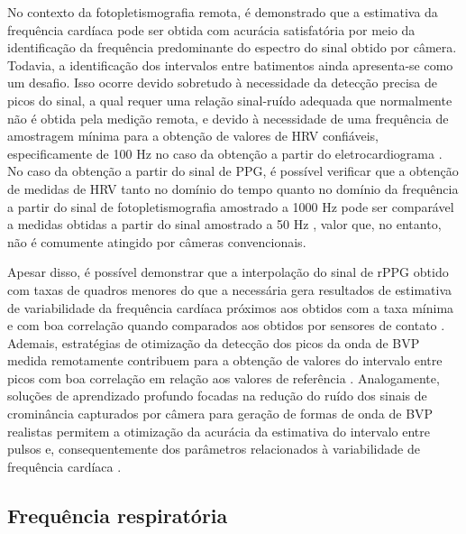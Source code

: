 No contexto da fotopletismografia remota, é demonstrado que a estimativa da frequência cardíaca pode ser obtida com acurácia satisfatória por meio da identificação da frequência predominante do espectro do sinal obtido por câmera. Todavia, a identificação dos intervalos entre batimentos ainda apresenta-se como um desafio. Isso ocorre devido sobretudo à necessidade da detecção precisa de picos do sinal, a qual requer uma relação sinal-ruído adequada que normalmente não é obtida pela medição remota, e devido à necessidade de uma frequência de amostragem mínima para a obtenção de valores de HRV confiáveis, especificamente de 100 Hz no caso da obtenção a partir do eletrocardiograma \cite{malik1996heart}. No caso da obtenção a partir do sinal de PPG, é possível verificar que a obtenção de medidas de HRV tanto no domínio do tempo quanto no domínio da frequência a partir do sinal de fotopletismografia amostrado a 1000 Hz pode ser comparável a medidas obtidas a partir do sinal amostrado a 50 Hz \cite{pelaez2021impact}, valor que, no entanto, não é comumente atingido por câmeras convencionais.

Apesar disso, é possível demonstrar que a interpolação do sinal de rPPG obtido com taxas de quadros menores do que a necessária gera resultados de estimativa de variabilidade da frequência cardíaca próximos aos obtidos com a taxa mínima e com boa correlação quando comparados aos obtidos por sensores de contato \cite{sun2013noncontact}. Ademais, estratégias de otimização da detecção dos picos da onda de BVP medida remotamente contribuem para a obtenção de valores do intervalo entre picos com boa correlação em relação aos valores de referência \cite{maki2019inter, li2020video}. Analogamente, soluções de aprendizado profundo focadas na redução do ruído dos sinais de crominância capturados por câmera para geração de formas de onda de BVP realistas permitem a otimização da acurácia da estimativa do intervalo entre pulsos e, consequentemente dos parâmetros relacionados à variabilidade de frequência cardíaca  \cite{Song2021pulsegan, yang2023cbppggan}. 

\subsection{Frequência respiratória}

